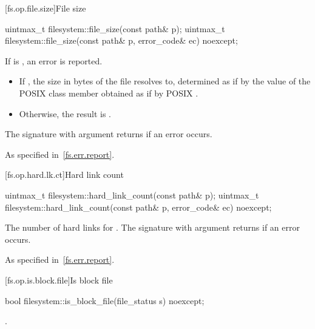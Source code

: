 [fs.op.file.size]{File size}

%
\begin{itemdecl}
uintmax_t filesystem::file_size(const path& p);
uintmax_t filesystem::file_size(const path& p, error_code& ec) noexcept;
\end{itemdecl}

\begin{itemdescr}
\pnum
\effects
If  is , an error is reported.

\pnum
\returns
\begin{itemize}
\item
  If , the size in bytes of the file
   resolves to, determined as if by the value of the POSIX 
  class member  obtained as if by POSIX .
\item
  Otherwise, the result is .
\end{itemize}
The signature with argument  returns 
if an error occurs.

\pnum
\throws
As specified in~\ref{fs.err.report}.
\end{itemdescr}


[fs.op.hard.lk.ct]{Hard link count}

%
\begin{itemdecl}
uintmax_t filesystem::hard_link_count(const path& p);
uintmax_t filesystem::hard_link_count(const path& p, error_code& ec) noexcept;
\end{itemdecl}

\begin{itemdescr}
\pnum
\returns
The number of hard links for . The signature
  with argument  returns 
  if an error occurs.

\pnum
\throws
As specified in~\ref{fs.err.report}.
\end{itemdescr}


[fs.op.is.block.file]{Is block file}

%
\begin{itemdecl}
bool filesystem::is_block_file(file_status s) noexcept;
\end{itemdecl}

\begin{itemdescr}
\pnum
\returns
{}.
\end{itemdescr}

